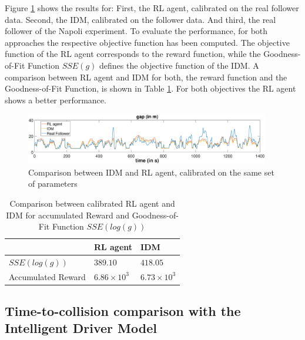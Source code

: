 \documentclass[review]{elsarticle}
\providecommand{\3}{{\ss}}
\begin{document}
Figure \ref{fig:IDMvsRL} shows the results for: First, the RL agent, calibrated on the real follower data. Second, the IDM, calibrated on the follower data. And third, the real follower of the Napoli experiment. To evaluate the performance, for both approaches the respective objective function has been computed. The objective function of the RL agent corresponds to the reward function, while the Goodness-of-Fit Function $SSE(g)$ defines the objective function of the IDM. A comparison between RL agent and IDM for both, the reward function and the Goodness-of-Fit Function, is shown in Table \ref{tab:objectiveFunc}. For both objectives the RL agent shows a better performance.

\begin{figure}
	
	\centering
	\includegraphics[width=0.95\textwidth]{images/IDMvsRL_dist}
	\caption{Comparison between IDM and RL agent, calibrated on the same set of parameters}
	\label{fig:IDMvsRL}
\end{figure}

\begin{table}
	\caption{Comparison between calibrated RL agent and IDM for accumulated Reward and Goodness-of-Fit Function $SSE(log(g))$} 
	\label{tab:objectiveFunc} 
	\begin{center}
		\begin{tabular}{p{} | p{} p{}  } 
			& RL agent & IDM   \\ \hline
			$SSE(log(g))$ & $389.10$ &  $418.05$	\\
			Accumulated Reward &  $6.86 \times 10^3$   & $6.73\times 10^3$
			
		\end{tabular}
	\end{center}
\end{table}

\subsection{Time-to-collision comparison with the Intelligent Driver Model}
\end{document}
